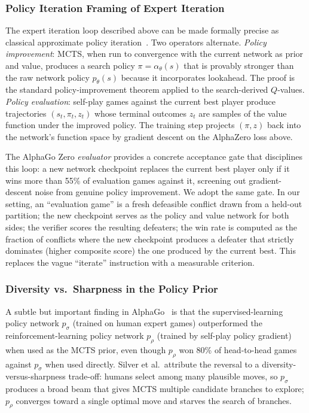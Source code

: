 \documentclass{article}
\begin{document}
\subsubsection{Policy Iteration Framing of Expert Iteration}

The expert iteration loop described above can be made formally precise as classical approximate policy iteration~\cite{silver2017alphagozero,parr2022active}. Two operators alternate. \emph{Policy improvement}: MCTS, when run to convergence with the current network as prior and value, produces a search policy $\pi = \alpha_\theta(s)$ that is provably stronger than the raw network policy $p_\theta(s)$ because it incorporates lookahead. The proof is the standard policy-improvement theorem applied to the search-derived $Q$-values. \emph{Policy evaluation}: self-play games against the current best player produce trajectories $(s_t, \pi_t, z_t)$ whose terminal outcomes $z_t$ are samples of the value function under the improved policy. The training step projects $(\pi, z)$ back into the network's function space by gradient descent on the AlphaZero loss above.

The AlphaGo Zero \emph{evaluator} provides a concrete acceptance gate that disciplines this loop: a new network checkpoint replaces the current best player only if it wins more than 55\% of evaluation games against it, screening out gradient-descent noise from genuine policy improvement. We adopt the same gate. In our setting, an ``evaluation game'' is a fresh defeasible conflict drawn from a held-out partition; the new checkpoint serves as the policy and value network for both sides; the verifier scores the resulting defeaters; the win rate is computed as the fraction of conflicts where the new checkpoint produces a defeater that strictly dominates (higher composite score) the one produced by the current best. This replaces the vague ``iterate'' instruction with a measurable criterion.

\subsubsection{Diversity vs.\ Sharpness in the Policy Prior}

A subtle but important finding in AlphaGo~\cite{silver2016alphago} is that the supervised-learning policy network $p_\sigma$ (trained on human expert games) outperformed the reinforcement-learning policy network $p_\rho$ (trained by self-play policy gradient) when used as the MCTS prior, even though $p_\rho$ won 80\% of head-to-head games against $p_\sigma$ when used directly. Silver et al.\ attribute the reversal to a diversity-versus-sharpness trade-off: humans select among many plausible moves, so $p_\sigma$ produces a broad beam that gives MCTS multiple candidate branches to explore; $p_\rho$ converges toward a single optimal move and starves the search of branches.
\end{document}
